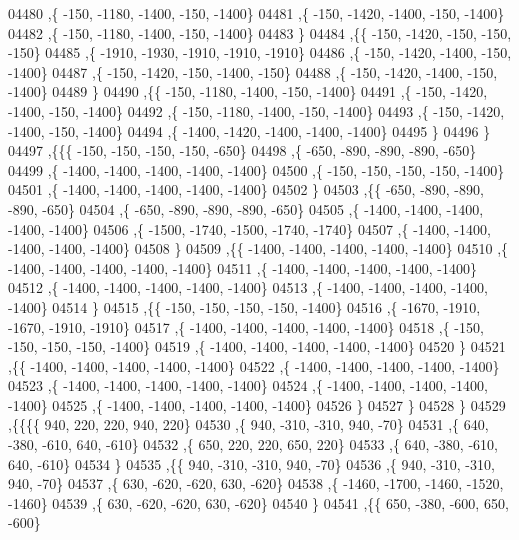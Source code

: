 \begin{DoxyCode}
04480     ,\{  -150, -1180, -1400,  -150, -1400\}
04481     ,\{  -150, -1420, -1400,  -150, -1400\}
04482     ,\{  -150, -1180, -1400,  -150, -1400\}
04483     \}
04484    ,\{\{  -150, -1420,  -150,  -150,  -150\}
04485     ,\{ -1910, -1930, -1910, -1910, -1910\}
04486     ,\{  -150, -1420, -1400,  -150, -1400\}
04487     ,\{  -150, -1420,  -150, -1400,  -150\}
04488     ,\{  -150, -1420, -1400,  -150, -1400\}
04489     \}
04490    ,\{\{  -150, -1180, -1400,  -150, -1400\}
04491     ,\{  -150, -1420, -1400,  -150, -1400\}
04492     ,\{  -150, -1180, -1400,  -150, -1400\}
04493     ,\{  -150, -1420, -1400,  -150, -1400\}
04494     ,\{ -1400, -1420, -1400, -1400, -1400\}
04495     \}
04496    \}
04497   ,\{\{\{  -150,  -150,  -150,  -150,  -650\}
04498     ,\{  -650,  -890,  -890,  -890,  -650\}
04499     ,\{ -1400, -1400, -1400, -1400, -1400\}
04500     ,\{  -150,  -150,  -150,  -150, -1400\}
04501     ,\{ -1400, -1400, -1400, -1400, -1400\}
04502     \}
04503    ,\{\{  -650,  -890,  -890,  -890,  -650\}
04504     ,\{  -650,  -890,  -890,  -890,  -650\}
04505     ,\{ -1400, -1400, -1400, -1400, -1400\}
04506     ,\{ -1500, -1740, -1500, -1740, -1740\}
04507     ,\{ -1400, -1400, -1400, -1400, -1400\}
04508     \}
04509    ,\{\{ -1400, -1400, -1400, -1400, -1400\}
04510     ,\{ -1400, -1400, -1400, -1400, -1400\}
04511     ,\{ -1400, -1400, -1400, -1400, -1400\}
04512     ,\{ -1400, -1400, -1400, -1400, -1400\}
04513     ,\{ -1400, -1400, -1400, -1400, -1400\}
04514     \}
04515    ,\{\{  -150,  -150,  -150,  -150, -1400\}
04516     ,\{ -1670, -1910, -1670, -1910, -1910\}
04517     ,\{ -1400, -1400, -1400, -1400, -1400\}
04518     ,\{  -150,  -150,  -150,  -150, -1400\}
04519     ,\{ -1400, -1400, -1400, -1400, -1400\}
04520     \}
04521    ,\{\{ -1400, -1400, -1400, -1400, -1400\}
04522     ,\{ -1400, -1400, -1400, -1400, -1400\}
04523     ,\{ -1400, -1400, -1400, -1400, -1400\}
04524     ,\{ -1400, -1400, -1400, -1400, -1400\}
04525     ,\{ -1400, -1400, -1400, -1400, -1400\}
04526     \}
04527    \}
04528   \}
04529  ,\{\{\{\{   940,   220,   220,   940,   220\}
04530     ,\{   940,  -310,  -310,   940,   -70\}
04531     ,\{   640,  -380,  -610,   640,  -610\}
04532     ,\{   650,   220,   220,   650,   220\}
04533     ,\{   640,  -380,  -610,   640,  -610\}
04534     \}
04535    ,\{\{   940,  -310,  -310,   940,   -70\}
04536     ,\{   940,  -310,  -310,   940,   -70\}
04537     ,\{   630,  -620,  -620,   630,  -620\}
04538     ,\{ -1460, -1700, -1460, -1520, -1460\}
04539     ,\{   630,  -620,  -620,   630,  -620\}
04540     \}
04541    ,\{\{   650,  -380,  -600,   650,  -600\}

\end{DoxyCode}

